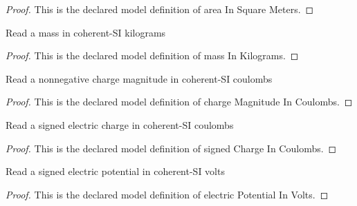 \begin{proof}
  This is the declared model definition of area In Square Meters.
\end{proof}
\begin{definition}
  \label{def:physics:phyx-mini-0908:phyxminiproblems-problemphyxmini0908-massinkilograms}
  Read a mass in coherent-SI kilograms
\end{definition}
\begin{proof}
  This is the declared model definition of mass In Kilograms.
\end{proof}
\begin{definition}
  \label{def:physics:phyx-mini-0908:phyxminiproblems-problemphyxmini0908-chargemagnitudeincoulombs}
  Read a nonnegative charge magnitude in coherent-SI coulombs
\end{definition}
\begin{proof}
  This is the declared model definition of charge Magnitude In Coulombs.
\end{proof}
\begin{definition}
  \label{def:physics:phyx-mini-0908:phyxminiproblems-problemphyxmini0908-signedchargeincoulombs}
  Read a signed electric charge in coherent-SI coulombs
\end{definition}
\begin{proof}
  This is the declared model definition of signed Charge In Coulombs.
\end{proof}
\begin{definition}
  \label{def:physics:phyx-mini-0908:phyxminiproblems-problemphyxmini0908-electricpotentialinvolts}
  Read a signed electric potential in coherent-SI volts
\end{definition}
\begin{proof}
  This is the declared model definition of electric Potential In Volts.
\end{proof}
